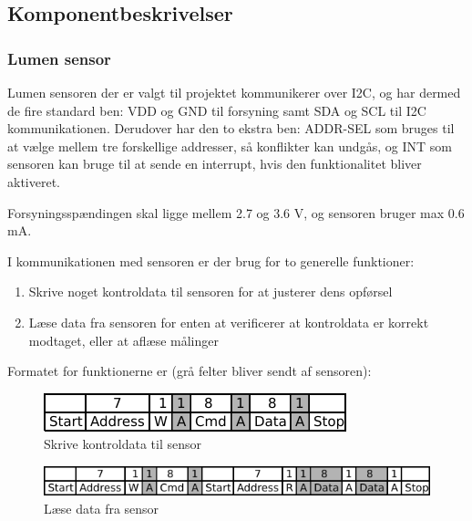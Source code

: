 \subsection{Komponentbeskrivelser}

\subsubsection{Lumen sensor}

Lumen sensoren der er valgt til projektet kommunikerer over I2C, og har dermed de fire standard ben: VDD og GND til forsyning samt SDA og SCL til I2C kommunikationen. Derudover har den to ekstra ben: ADDR-SEL som bruges til at vælge mellem tre forskellige addresser, så konflikter kan undgås, og INT som sensoren kan bruge til at sende en interrupt, hvis den funktionalitet bliver aktiveret.

Forsyningsspændingen skal ligge mellem 2.7 og 3.6 V, og sensoren bruger max 0.6 mA.

I kommunikationen med sensoren er der brug for to generelle funktioner:

\begin{enumerate}
    \item Skrive noget kontroldata til sensoren for at justerer dens opførsel
    \item Læse data fra sensoren for enten at verificerer at kontroldata er korrekt modtaget, eller at aflæse målinger
\end{enumerate}

Formatet for funktionerne er (grå felter bliver sendt af sensoren):

\begin{figure}[H] \centering
    \includegraphics{0_Filer/Figuer/5_HW_Design/Lumen_skriv.png}
    \caption{Skrive kontroldata til sensor}
    \label{fig:HWD_Lumen_skriv}
\end{figure}

\begin{figure}[H] \centering
    \includegraphics[width=\textwidth]{0_Filer/Figuer/5_HW_Design/Lumen_laes.png}
    \caption{Læse data fra sensor}
    \label{fig:HWD_Lumen_laes}
\end{figure}

